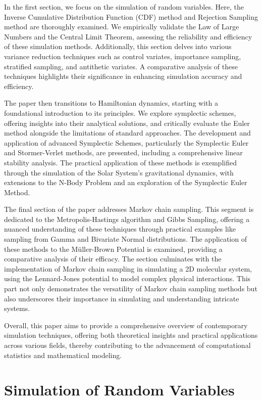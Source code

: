 \documentclass{report}
\begin{document}
In the first section, we focus on the simulation of random variables. Here, the Inverse Cumulative Distribution Function (CDF) method and Rejection Sampling method are thoroughly examined. We empirically validate the Law of Large Numbers and the Central Limit Theorem, assessing the reliability and efficiency of these simulation methods. Additionally, this section delves into various variance reduction techniques such as control variates, importance sampling, stratified sampling, and antithetic variates. A comparative analysis of these techniques highlights their significance in enhancing simulation accuracy and efficiency.

The paper then transitions to Hamiltonian dynamics, starting with a foundational introduction to its principles. We explore symplectic schemes, offering insights into their analytical solutions, and critically evaluate the Euler method alongside the limitations of standard approaches. The development and application of advanced Symplectic Schemes, particularly the Symplectic Euler and Stormer-Verlet methods, are presented, including a comprehensive linear stability analysis. The practical application of these methods is exemplified through the simulation of the Solar System's gravitational dynamics, with extensions to the N-Body Problem and an exploration of the Symplectic Euler Method.

The final section of the paper addresses Markov chain sampling. This segment is dedicated to the Metropolis-Hastings algorithm and Gibbs Sampling, offering a nuanced understanding of these techniques through practical examples like sampling from Gamma and Bivariate Normal distributions. The application of these methods to the Müller-Brown Potential is examined, providing a comparative analysis of their efficacy. The section culminates with the implementation of Markov chain sampling in simulating a 2D molecular system, using the Lennard-Jones potential to model complex physical interactions. This part not only demonstrates the versatility of Markov chain sampling methods but also underscores their importance in simulating and understanding intricate systems.

Overall, this paper aims to provide a comprehensive overview of contemporary simulation techniques, offering both theoretical insights and practical applications across various fields, thereby contributing to the advancement of computational statistics and mathematical modeling.

\newpage

\chapter{Simulation of Random Variables}
\label{sec:simulation_of_random_variables}
\end{document}
